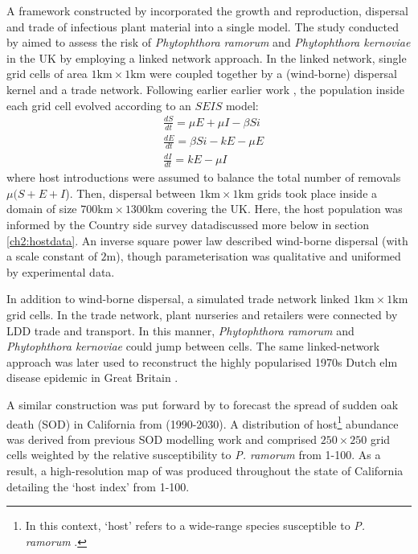A framework constructed by \cite{harwood2009epidemiological} incorporated the growth and reproduction, dispersal and trade
of infectious plant material into a single model. The study conducted by \cite{harwood2009epidemiological} aimed
to assess the risk of \textit{Phytophthora ramorum} and \textit{Phytophthora kernoviae} in the UK by
employing a linked network approach. 
In the linked network, single grid cells of area $\mathrm{1km \times 1km}$ were coupled together by a (wind-borne)
dispersal kernel and a trade network. 
Following earlier earlier work \cite{madden2007study}, the population inside each grid cell evolved according
to an $SEIS$ model:
\begin{align}
    \label{eq:phyt-model1}
    &\frac{dS}{dt} = \mu E + \mu I - \beta S i\\
    &\frac{dE}{dt} =  \beta S i - k E - \mu E   \\
    \label{eq:phyt-model3}
    &\frac{dI}{dt} = k E - \mu I
\end{align}
where host introductions were assumed to balance the total number of removals $\mu (S + E + I$).
Then, dispersal between $\mathrm{1km \times 1km}$ grids took place inside a domain of size $\mathrm{700km \times 1300km}$ 
covering the UK. Here, the host population was informed by the Country side survey data\textemdash discussed more 
below in section \ref{ch2:hostdata}. An inverse square power law described wind-borne dispersal (with a scale constant
of $2\mathrm{m}$), though parameterisation was qualitative and uniformed by experimental data.

In addition to wind-borne dispersal, a simulated trade network linked $\mathrm{1km \times 1km}$ grid cells. 
In the trade network, plant nurseries and retailers were connected by LDD trade and transport. 
In this manner, \textit{Phytophthora ramorum} and \textit{Phytophthora kernoviae} could jump 
between cells. The same linked-network approach was later used to reconstruct the highly 
popularised 1970s Dutch elm disease epidemic in Great Britain \cite{doi:10.1111/j.1365-3059.2010.02391.x, potter2011learning}.

A similar construction was put forward by \cite{meentemeyer2011epidemiological} to 
forecast the spread of sudden oak death (SOD) in California from (1990-2030).
A distribution of host\footnote{In this context, `host' refers to a wide-range
species susceptible to \textit{P. ramorum} \cite{tooley2004susceptibility}.
} abundance was derived from previous SOD modelling work 
\cite{meentemeyer2004mapping} and comprised $\mathrm{250 \times 250}$ grid cells
weighted by the relative susceptibility to \textit{P. ramorum} from 1-100. As a result,
a high-resolution map of was produced throughout the state of California detailing the `host index'
from 1-100.

